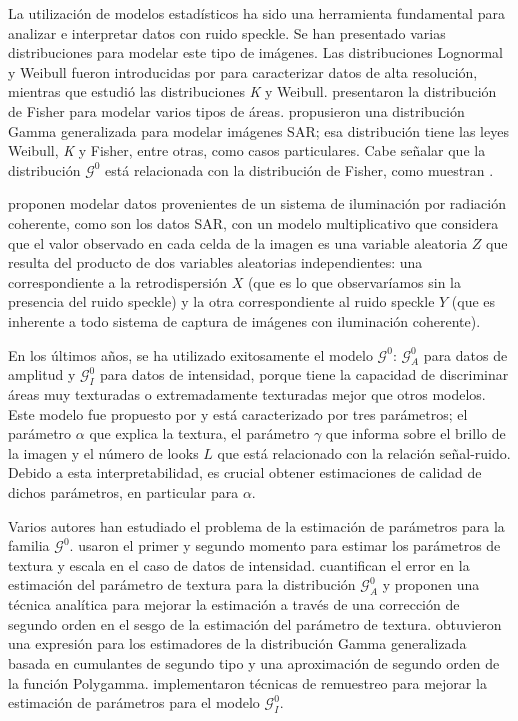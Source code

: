 La utilización de modelos estadísticos ha sido una herramienta fundamental para analizar e interpretar datos con ruido speckle. 
Se han presentado varias distribuciones para modelar este tipo de imágenes. Las distribuciones Lognormal y Weibull fueron introducidas por \citet{oliverquegan98} para caracterizar datos de alta resolución, mientras que \citet{Oliver1993} estudió las distribuciones \textit{K} y Weibull. 
\citet{Tison2004} presentaron la distribución de Fisher para modelar varios tipos de áreas. 
\citet{Li2011} propusieron una distribución Gamma generalizada para modelar imágenes SAR; esa distribución tiene las leyes Weibull, \textit{K} y Fisher, entre otras, como casos particulares. 
Cabe señalar que la distribución $\mathcal{G}^0$ está relacionada con la distribución de Fisher, como muestran \citet{MejailJacoboFreryBustos:IJRS}.

\citet{oliverquegan98} proponen modelar datos provenientes de un sistema de iluminación por radiación coherente, como son los datos SAR, con un modelo multiplicativo que considera que el valor observado en cada celda de la imagen es una variable aleatoria $Z$ que resulta del producto de dos variables aleatorias independientes: una correspondiente a la retrodispersión $X$ (que es lo que observaríamos sin la presencia del ruido speckle) y la otra correspondiente al ruido speckle $Y$ (que es inherente a todo sistema de captura de imágenes con iluminación coherente). 

En los últimos años, se ha utilizado exitosamente el modelo $\mathcal{G}^0$: $\mathcal{G}_A^0$ para datos de amplitud y $\mathcal G_I^0$ para datos de intensidad, porque tiene la capacidad de discriminar áreas muy texturadas o extremadamente texturadas mejor que otros modelos. Este modelo fue propuesto por \citet{Frery97} y está caracterizado por tres parámetros; el parámetro $\alpha$ que explica la textura, el parámetro $\gamma $ que informa sobre el brillo de la imagen y el número de looks $L$ que está relacionado con la relación señal-ruido.
Debido a esta interpretabilidad, es crucial obtener estimaciones de calidad de dichos parámetros, en particular para $\alpha$.

Varios autores han estudiado el problema de la estimación de parámetros para la familia $\mathcal G^0$. \citet{Freitas2005} usaron el primer y segundo momento para estimar los parámetros de textura y escala en el caso de datos de intensidad.
\citet{VasconcellosFrerySilva:CompStat} cuantifican el error en la estimación del parámetro de textura para la distribución $\mathcal G_A^0$ y proponen una técnica analítica para mejorar la estimación a través de una corrección de segundo orden en el sesgo de la estimación del parámetro de textura. \citet{Li2011} obtuvieron una expresión para los estimadores de la distribución Gamma generalizada basada en cumulantes de segundo tipo y una aproximación de segundo orden de la función Polygamma. \citet{CribariFrerySilva:CSDA} implementaron técnicas de remuestreo para mejorar la estimación de parámetros para el modelo $\mathcal G_I^0$.

